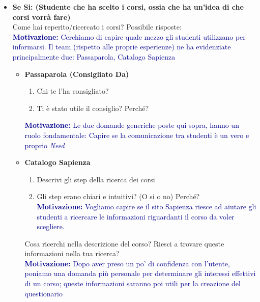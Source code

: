\begin{itemize}
\begin{itemize}
\begin{itemize}
            \item \textbf{Se Si: (Studente che ha scelto i corsi, ossia che ha un’idea di che corsi vorrà fare)}\\
            Come hai reperito/ricercato i corsi? Possibile risposte:\\
            \textcolor{darkblue}{\textbf{Motivazione:} Cerchiamo di capire quale mezzo gli studenti utilizzano per informarsi. 
            Il team (rispetto alle proprie esperienze) ne ha evidenziate principalmente due: Passaparola, Catalogo Sapienza}

            \begin{itemize}
                \item \textbf{Passaparola (Consigliato Da)}
                \begin{enumerate}
                    \item Chi te l'ha consigliato?
                    \item Ti è stato utile il consiglio? Perché?
                \end{enumerate}
                \textcolor{darkblue}{\textbf{Motivazione:} Le due domande generiche poste qui sopra, hanno un ruolo fondamentale: Capire se la comunicazione tra studenti è un vero e proprio \textit{Need}}

                \item \textbf{Catalogo Sapienza}
                \begin{enumerate}
                    \item Descrivi gli step della ricerca dei corsi
                    \item Gli step erano chiari e intuitivi? (O si o no) Perché?\\
                    \textcolor{darkblue}{\textbf{Motivazione:} Vogliamo capire se il sito Sapienza riesce ad aiutare gli studenti a ricercare le informazioni riguardanti il corso da voler scegliere.}
                \end{enumerate}
                Cosa ricerchi nella descrizione del corso? Riesci a trovare queste informazioni nella tua ricerca?\\
                \textcolor{darkblue}{\textbf{Motivazione:} Dopo aver preso un po' di confidenza con l'utente, poniamo una domanda più personale per determinare gli interessi 
                effettivi di un corso; queste informazioni saranno poi utili per la creazione del questionario}
            \end{itemize}
            

\end{itemize}
\end{itemize}
\end{itemize}
